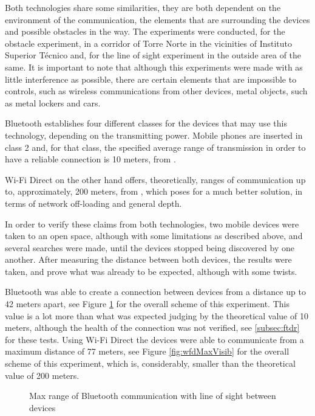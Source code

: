 Both technologies share some similarities, they are both dependent on the environment of the communication, the elements that are surrounding the devices and possible obstacles in the way. The experiments were conducted, for the obstacle experiment, in a corridor of Torre Norte in the vicinities of Instituto Superior Técnico and, for the line of sight experiment in the outside area of the same. It is important to note that although this experiments were made with as little interference as possible, there are certain elements that are impossible to controls, such as wireless communications from other devices, metal objects, such as metal lockers and cars.

Bluetooth establishes four different classes for the devices that may use this technology, depending on the transmitting power. Mobile phones are inserted in class 2 and, for that class, the specified average range of transmission in order to have a reliable connection is 10 meters, from \cite{bluetooth}.

Wi-Fi Direct on the other hand offers, theoretically, ranges of communication up to, approximately, 200 meters, from \cite{wfdrange}, which poses for a much better solution, in terms of network off-loading and general depth.

In order to verify these claims from both technologies, two mobile devices were taken to an open space, although with some limitations as described above, and several searches were made, until the devices stopped being discovered by one another. After measuring the distance between both devices, the results were taken, and prove what was already to be expected, although with some twists. 

Bluetooth was able to create a connection between devices from a distance up to 42 meters apart, see Figure \ref{fig:btMaxVisib} for the overall scheme of this experiment. This value is a lot more than what was expected judging by the theoretical value of 10 meters, although the health of the connection was not verified, see \ref{subsec:ftdr} for these tests. Using Wi-Fi Direct the devices were able to communicate from a maximum distance of 77 meters, see Figure \ref{fig:wfdMaxVisib} for the overall scheme of this experiment, which is, considerably, smaller than the theoretical value of 200 meters.

\begin{figure}[ht]
   \noindent{}
	\caption{\label{fig:btMaxVisib} Max range of Bluetooth communication with line of sight between devices}
\end{figure}

